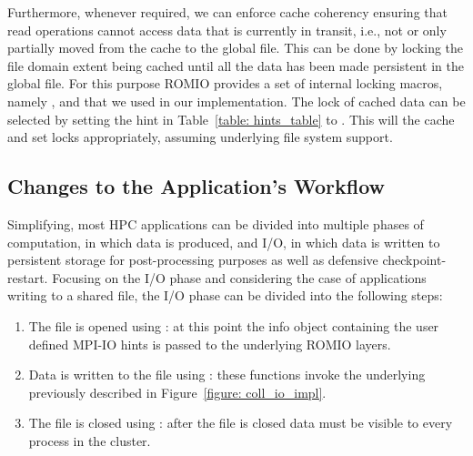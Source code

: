 Furthermore, whenever required, we can enforce cache coherency ensuring that read operations cannot access data that is currently in transit, i.e., not or only partially moved from the cache to the global file. This can be done by locking the file domain extent being cached until all the data has been made persistent in the global file. For this purpose ROMIO provides a set of internal locking macros, namely ,  and  that we used in our implementation. The lock of cached data can be selected by setting the  hint in Table~\ref{table: hints_table} to . This will  the cache and set locks appropriately, assuming underlying file system support.

\subsection{Changes to the Application's Workflow}
\label{subsec: new-workflow}
Simplifying, most HPC applications can be divided into multiple phases of computation, in which data is produced, and I/O, in which data is written to persistent storage for post-processing purposes as well as defensive checkpoint-restart. Focusing on the I/O phase and considering the case of applications writing to a shared file, the I/O phase can be divided into the following steps:
\begin{enumerate}
        \item The file is opened using : at this point the info object containing the user defined MPI-IO hints is passed to the underlying ROMIO layers.
        \item Data is written to the file using : these functions invoke the underlying  previously described in Figure~\ref{figure: coll_io_impl}.
        \item The file is closed using : after the file is closed data must be visible to every process in the cluster. 
\end{enumerate}

